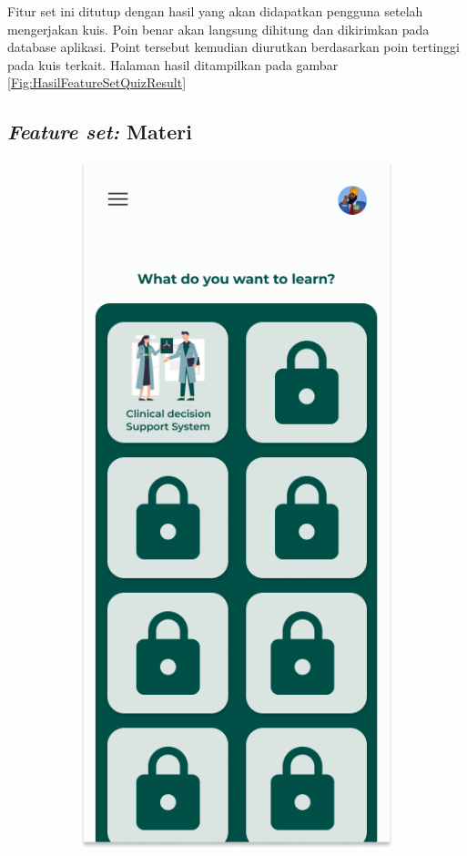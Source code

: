 Fitur set ini ditutup dengan hasil yang akan didapatkan pengguna setelah mengerjakan kuis. Poin benar akan langsung dihitung dan dikirimkan pada database aplikasi.
Point tersebut kemudian diurutkan berdasarkan poin tertinggi pada kuis terkait. Halaman hasil ditampilkan pada gambar \ref*{Fig:HasilFeatureSetQuizResult}
\subsection{\textit{Feature set:} Materi}
\begin{figure}[H]
	\centering
	\begin{subfigure}[b]{0.23\textwidth}
		\centering
	  \includegraphics[width=\linewidth]{contents/chapter-3/images/HF-materi.png}

\end{subfigure}
\end{figure}
